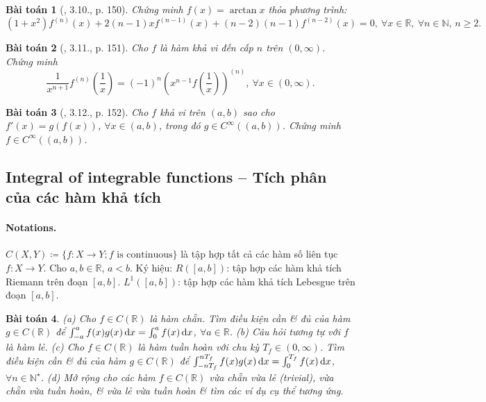 \documentclass{article}
\newtheorem{baitoan}{Bài toán}
\begin{document}
\begin{baitoan}[\cite{Quoc_Long_Dat_Nam_VMC}, 3.10., p. 150]
	Chứng minh $f(x) = \arctan x$ thỏa phương trình:
	\begin{equation*}
		(1 + x^2)f^{(n)}(x) + 2(n - 1)xf^{(n-1)}(x) + (n - 2)(n - 1)f^{(n-2)}(x) = 0,\ \forall x\in\mathbb{R},\ \forall n\in\mathbb{N},\,n\ge2.
	\end{equation*}
\end{baitoan}

\begin{baitoan}[\cite{Quoc_Long_Dat_Nam_VMC}, 3.11., p. 151]
	Cho $f$ là hàm khả vi đến cấp $n$ trên $(0,\infty)$. Chứng minh
	\begin{equation*}
		\frac{1}{x^{n+1}}f^{(n)}\left(\frac{1}{x}\right) = (-1)^n\left(x^{n-1}f\left(\frac{1}{x}\right)\right)^{(n)},\ \forall x\in(0,\infty).
	\end{equation*}
\end{baitoan}

\begin{baitoan}[\cite{Quoc_Long_Dat_Nam_VMC}, 3.12., p. 152]
	Cho $f$ khả vi trên $(a,b)$ sao cho $f'(x) = g(f(x))$, $\forall x\in(a,b)$, trong đó $g\in C^\infty((a,b))$. Chứng minh $f\in C^\infty((a,b))$.
\end{baitoan}


\subsection{Integral of integrable functions -- Tích phân của các hàm khả tích}

\paragraph{Notations.} $C(X,Y)\coloneqq\{f:X\to Y;f\mbox{ is continuous}\}$ là tập hợp tất cả các hàm số liên tục $f:X\to Y$. Cho $a,b\in\mathbb{R}$, $a < b$. Ký hiệu: $R([a,b])$: tập hợp các hàm khả tích Riemann trên đoạn $[a,b]$. $L^1([a,b])$: tập hợp các hàm khả tích Lebesgue trên đoạn $[a,b]$.

\begin{baitoan}
	(a) Cho $f\in C(\mathbb{R})$ là hàm chẵn. Tìm điều kiện cần \& đủ của hàm $g\in C(\mathbb{R})$ để $\int_{-a}^a f(x)g(x)\,{\rm d}x = \int_0^a f(x)\,{\rm d}x$, $\forall a\in\mathbb{R}$. (b) Câu hỏi tương tự với $f$ là hàm lẻ. (c) Cho $f\in C(\mathbb{R})$ là hàm tuần hoàn với chu kỳ $T_f\in(0,\infty)$. Tìm điều kiện cần \& đủ của hàm $g\in C(\mathbb{R})$ để  $\int_{-nT_f}^{nT_f} f(x)g(x)\,{\rm d}x = \int_0^{T_f} f(x)\,{\rm d}x$, $\forall n\in\mathbb{N}^\star$. (d) Mở rộng cho các hàm $f\in C(\mathbb{R})$ vừa chẵn vừa lẻ (trivial), vừa chẵn vừa tuần hoàn, \& vừa lẻ vừa tuần hoàn \& tìm các ví dụ cụ thể tương ứng.
\end{baitoan}
\end{document}

